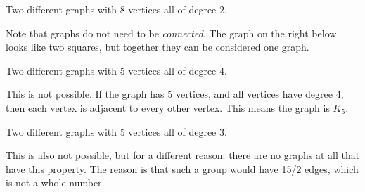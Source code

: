\documentclass[10pt]{exam}
\def\r{2.5pt}
\def\v{circle (\r)}
\begin{document}
\begin{questions}
\begin{solution}
\begin{center}
\end{center}
\end{solution}
\vfill
\question Two different graphs with 8 vertices all of degree 2.

\begin{solution} Note that graphs do not need to be \emph{connected}.  The graph on the right below looks like two squares, but together they can be considered one graph.

\begin{center}
\hspace{.3\textwidth}
\end{center}
\end{solution}
\vfill
\question Two different graphs with 5 vertices all of degree 4.
\begin{solution}
This is not possible.  If the graph has 5 vertices, and all vertices have degree 4, then each vertex is adjacent to every other vertex.  This means the graph is $K_5$.
\end{solution}
\vfill
\question Two different graphs with 5 vertices all of degree 3.
\begin{solution}
This is also not possible, but for a different reason: there are no graphs at all that have this property.  The reason is that such a group would have 15/2 edges, which is not a whole number.
\end{solution}
\vfill



\end{questions}
\end{document}
